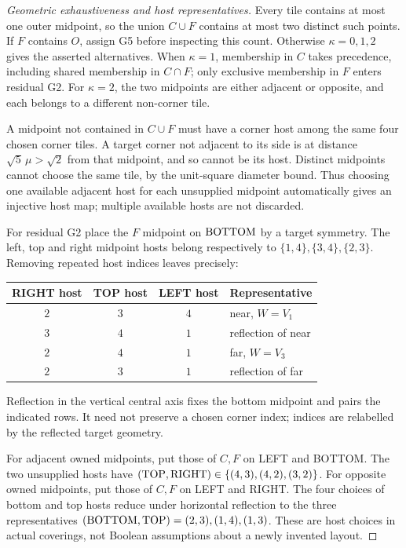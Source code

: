 \begin{proof}[Geometric exhaustiveness and host representatives]
Every tile contains at most one outer midpoint, so the union $C\cup F$
contains at most two distinct such points. If $F$ contains $O$, assign G5
before inspecting this count. Otherwise $\kappa=0,1,2$ gives the asserted
alternatives. When $\kappa=1$, membership in $C$ takes precedence, including
shared membership in $C\cap F$; only exclusive membership in $F$ enters
residual G2. For $\kappa=2$, the two midpoints are either adjacent or
opposite, and each belongs to a different non-corner tile.

A midpoint not contained in $C\cup F$ must have a corner host among the
same four chosen corner tiles. A target corner not adjacent to its side
is at distance $\sqrt5\,\mu>\sqrt2$ from that midpoint, and so cannot be
its host. Distinct midpoints cannot choose the same tile, by the
unit-square diameter bound. Thus choosing one available adjacent host
for each unsupplied midpoint automatically gives an injective host map;
multiple available hosts are not discarded.

For residual G2 place the $F$ midpoint on $\mathrm{BOTTOM}$ by a target symmetry.
The left, top and right midpoint hosts belong respectively to
$\{1,4\},\{3,4\},\{2,3\}$. Removing repeated host indices leaves precisely:
\begin{center}\small
\begin{tabular}{@{}cccl@{}}
\toprule
RIGHT host & TOP host & LEFT host & Representative\\\midrule
$2$ & $3$ & $4$ & near, $W=V_1$\\
$3$ & $4$ & $1$ & reflection of near\\
$2$ & $4$ & $1$ & far, $W=V_3$\\
$2$ & $3$ & $1$ & reflection of far\\
\bottomrule
\end{tabular}
\end{center}
Reflection in the vertical central axis fixes the bottom midpoint and
pairs the indicated rows. It need not preserve a chosen corner index;
indices are relabelled by the reflected target geometry.

For adjacent owned midpoints, put those of $C,F$ on LEFT and BOTTOM.
The two unsupplied hosts have
$(\mathrm{TOP},\mathrm{RIGHT})\in\{(4,3),(4,2),(3,2)\}$.
For opposite owned midpoints, put those of $C,F$ on LEFT and RIGHT.
The four choices of bottom and top hosts reduce under horizontal
reflection to the three representatives
$(\mathrm{BOTTOM},\mathrm{TOP})=(2,3),(1,4),(1,3)$.
These are host choices in actual coverings, not Boolean assumptions
about a newly invented layout.
\end{proof}

